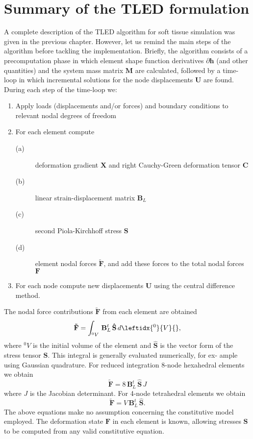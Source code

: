 \section{Summary of the TLED formulation}
A complete description of the TLED algorithm for soft tissue simulation was given in the previous chapter. However, let us remind the main steps of the algorithm before tackling the implementation. Briefly, the algorithm consists of a precomputation phase in which element shape function derivatives $ \partial \mathbf{h} $ (and other quantities) and the system mass matrix $ \mathbf{M} $ are calculated, followed by a time-loop in which incremental solutions for the node displacements $ \mathbf{U} $ are found. During each step of the time-loop we:
\begin{enumerate}
\item Apply loads (displacements and/or forces) and boundary conditions to relevant nodal degrees of freedom
\item For each element compute
\begin{description}
\item[(a)] deformation gradient $ \mathbf{X} $ and right Cauchy-Green deformation tensor $ \mathbf{C} $
\item[(b)] linear strain-displacement matrix $ \mathbf{B}_L $
\item[(c)] second Piola-Kirchhoff stress $ \mathbf{S} $
\item[(d)] element nodal forces $ \mathbf{\tilde{F}} $, and add these forces to the total nodal forces $ \mathbf{F} $
\end{description}
\item For each node compute new displacements $ \mathbf{U} $ using the central difference method.
\end{enumerate}

\bigskip

\noindent The nodal force contributions $ \mathbf{\tilde{F}} $ from each element are obtained 
\begin{equation}
\mathbf{\tilde{F}} = \int_{^0 V} \, \mathbf{B}_L^t \, \mathbf{\hat{S}} \, d\leftidx{^0}{ V }{},
\end{equation}
where $ ^0 V $ is the initial volume of the element and $ \mathbf{\hat{S}} $ is the vector form of the stress tensor $ \mathbf{S} $. This integral is generally evaluated numerically, for ex- ample using Gaussian quadrature. For reduced integration 8-node hexahedral elements we obtain
\begin{equation}
\mathbf{\tilde{F}} = 8 \, \mathbf{B}_L^t \, \mathbf{\hat{S}} \, J
\end{equation}
where $ J $ is the Jacobian determinant. For 4-node tetrahedral elements we obtain
\begin{equation}
\mathbf{\tilde{F}} = V \, \mathbf{B}_L^t \, \mathbf{\hat{S}}.
\end{equation}
The above equations make no assumption concerning the constitutive model employed. The deformation state $ \mathbf{F} $ in each element is known, allowing stresses $ \mathbf{S} $ to be computed from any valid constitutive equation. 


